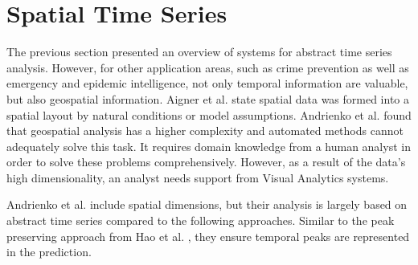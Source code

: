 \documentclass[electronic]{vgtc}             %
\begin{document}
\section{Spatial Time Series\label{sec:spatiotemp}}
The previous section presented an overview of systems for abstract time series analysis. 
However, for other application areas, such as crime prevention as well as emergency and epidemic intelligence, not only temporal information are valuable, but also geospatial information.
Aigner et al. \cite{Aigner:2007} state spatial data was formed into a spatial layout by natural conditions or model assumptions.
Andrienko et al. \cite{Andrienko:2008, Andrienko:2010:Space} found that geospatial analysis has a higher complexity and automated methods cannot adequately solve this task. 
It requires domain knowledge from a human analyst in order to solve these problems comprehensively.
However, as a result of the data's high dimensionality, an analyst needs support from Visual Analytics systems.

Andrienko et al. \cite{Andrienko:2010} include spatial dimensions, but their analysis is largely based on abstract time series compared to the following approaches.
Similar to the peak preserving approach from Hao et al. \cite{Hao:2012}, they ensure temporal peaks are represented in the prediction. 
\end{document}
